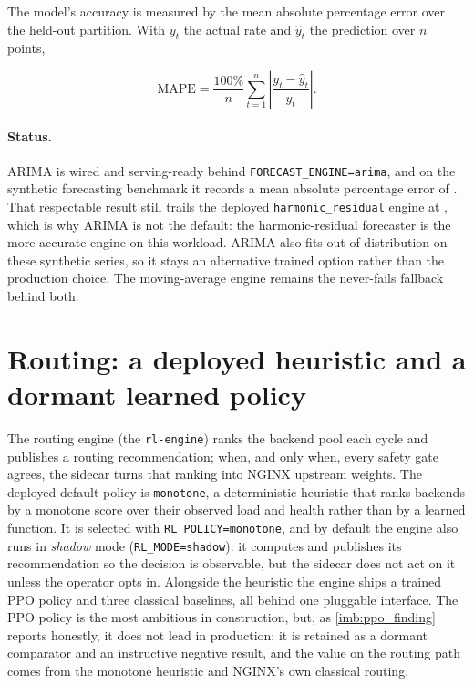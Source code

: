 The model's accuracy is measured by the mean absolute percentage error over the
held-out partition. With $y_t$ the actual rate and $\hat{y}_t$ the prediction
over $n$ points,

\begin{equation}\label{imb:eq:mape}
  \mathrm{MAPE} = \frac{100\%}{n}\sum_{t=1}^{n}
  \left| \frac{y_t - \hat{y}_t}{y_t} \right| .
\end{equation}

\paragraph{Status.} ARIMA is wired and serving-ready behind
\texttt{FORECAST\_ENGINE=arima}, and on the synthetic forecasting benchmark it
records a mean absolute percentage error of \BMfcMapeArima{}. That respectable
result still trails the deployed \texttt{harmonic\_residual} engine at \BMfcMape{},
which is why ARIMA is not the default: the harmonic-residual forecaster is the more
accurate engine on this workload. ARIMA also fits out of distribution on these
synthetic series, so it stays an alternative trained option rather than the
production choice. The moving-average engine remains the never-fails fallback
behind both.

\section{Routing: a deployed heuristic and a dormant learned policy}\label{imb:ppo}

The routing engine (the \texttt{rl-engine}) ranks the backend pool each cycle and
publishes a routing recommendation; when, and only when, every safety gate agrees,
the sidecar turns that ranking into NGINX upstream weights. The deployed default
policy is \texttt{monotone}, a deterministic heuristic that ranks backends by a
monotone score over their observed load and health rather than by a learned
function. It is selected with \texttt{RL\_POLICY=monotone}, and by default the
engine also runs in \emph{shadow} mode (\texttt{RL\_MODE=shadow}): it computes and
publishes its recommendation so the decision is observable, but the sidecar does
not act on it unless the operator opts in. Alongside the heuristic the engine ships
a trained PPO policy and three classical baselines, all behind one pluggable
interface. The PPO policy is the most ambitious in construction, but, as
\cref{imb:ppo_finding} reports honestly, it does not lead in production: it is
retained as a dormant comparator and an instructive negative result, and the value
on the routing path comes from the monotone heuristic and NGINX's own classical
routing.

